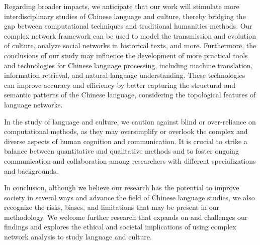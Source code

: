 \documentclass[11pt]{article}
\begin{document}
Regarding broader impacts, we anticipate that our work will stimulate more interdisciplinary studies of Chinese language and culture, thereby bridging the gap between computational techniques and traditional humanities methods. Our complex network framework can be used to model the transmission and evolution of culture, analyze social networks in historical texts, and more. Furthermore, the conclusions of our study may influence the development of more practical tools and technologies for Chinese language processing, including machine translation, information retrieval, and natural language understanding. These technologies can improve accuracy and efficiency by better capturing the structural and semantic patterns of the Chinese language, considering the topological features of language networks.

In the study of language and culture, we caution against blind or over-reliance on computational methods, as they may oversimplify or overlook the complex and diverse aspects of human cognition and communication. It is crucial to strike a balance between quantitative and qualitative methods and to foster ongoing communication and collaboration among researchers with different specializations and backgrounds.

In conclusion, although we believe our research has the potential to improve society in several ways and advance the field of Chinese language studies, we also recognize the risks, biases, and limitations that may be present in our methodology. We welcome further research that expands on and challenges our findings and explores the ethical and societal implications of using complex network analysis to study language and culture.


\end{document}
